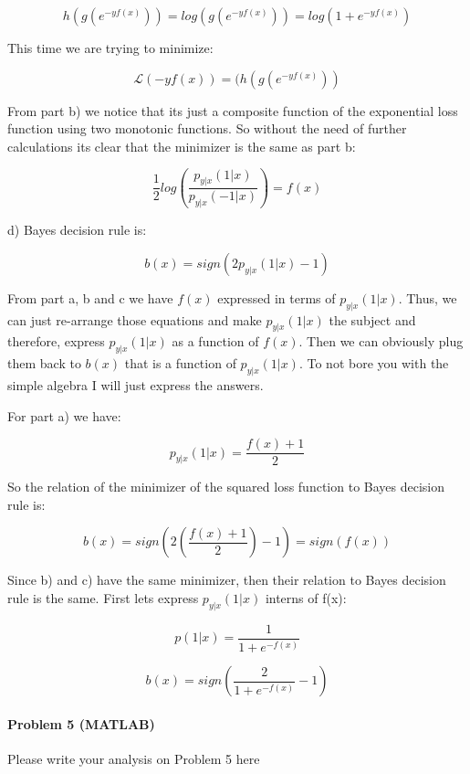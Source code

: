 \documentclass[12pt]{report}
\begin{document}
$$h(g(e^{-yf(x)})) = log(g( e^{-yf(x)} )) = log(1 + e^{-yf(x)})$$

This time we are trying to minimize:

$$\mathcal{L}(-yf(x)) = (h(g(e^{-yf(x)}))$$

From part b) we notice that its just a composite function of the exponential loss function using two monotonic functions. So without the need of further calculations its clear that the minimizer is the same as part b:

$$\frac{1}{2}log\left( \frac{p_{y|x}(1|x)}{p_{y|x}(-1|x)} \right) = f(x)$$

d) Bayes decision rule is:

$$ b(x) = sign(2p_{y|x}(1|x) -1)$$

From part a, b and c we have $f(x)$ expressed in terms of $p_{y|x}(1|x)$. Thus, we can just re-arrange those equations and make $p_{y|x}(1|x)$ the subject and therefore, express $p_{y|x}(1|x)$ as a function of $f(x)$. Then we can obviously plug them back to $b(x)$ that is a function of $p_{y|x}(1|x)$. To not bore you with the simple algebra I will just express the answers.

For part a) we have:

$$p_{y|x}(1|x) = \frac{f(x) + 1}{2}$$

So the relation of the minimizer of the squared loss function to Bayes decision rule is:

$$b(x) = sign(2\left( \frac{f(x) + 1}{2} \right) -1 ) = sign(f(x)) $$

Since b) and c) have the same minimizer, then their relation to Bayes decision rule is the same. First lets express $p_{y|x}(1|x)$ interns of f(x):

$$p(1|x) = \frac{1}{1+e^{-f(x)} }$$

$$ b(x) = sign \left( \frac{2}{1+e^{-f(x)}}   - 1 \right)$$

\paragraph{Problem 5 (MATLAB)}
Please write your analysis on Problem 5 here
\end{document}
